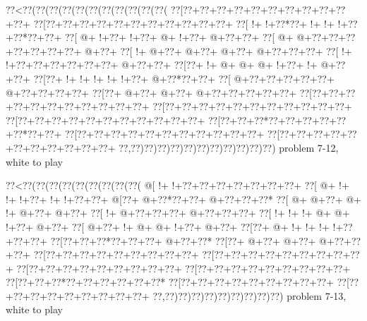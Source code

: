 \vbox{\vbox{\goo
\0??<\0??(\0??(\0??(\0??(\0??(\0??(\0??(\0??(\0??(\0??(\0??(
\0??[\0??+\0??+\0??+\0??+\0??+\0??+\0??+\0??+\0??+\0??+\0??+
\0??[\0??+\0??+\0??+\0??+\0??+\0??+\0??+\0??+\0??+\0??+\0??+
\0??[\- !+\- !+\0??*\0??+\- !+\- !+\- !+\0??+\0??*\0??+\0??+
\0??[\- @+\- !+\0??+\- !+\0??+\- @+\- !+\0??+\- @+\0??+\0??+
\0??[\- @+\- @+\0??+\0??+\0??+\0??+\0??+\0??+\0??+\- @+\0??+
\0??[\- !+\- @+\0??+\- @+\0??+\- @+\0??+\- @+\0??+\0??+\0??+
\0??[\- !+\- !+\0??+\0??+\0??+\0??+\0??+\0??+\- @+\0??+\0??+
\0??[\0??+\- !+\- @+\- @+\- @+\- !+\0??+\- !+\- @+\0??+\0??+
\0??[\0??+\- !+\- !+\- !+\- !+\- !+\0??+\- @+\0??*\0??+\0??+
\0??[\- @+\0??+\0??+\0??+\0??+\0??+\- @+\0??+\0??+\0??+\0??+
\0??[\0??+\- @+\0??+\- @+\0??+\- @+\0??+\0??+\0??+\0??+\0??+
\0??[\0??+\0??+\0??+\0??+\0??+\0??+\0??+\0??+\0??+\0??+\0??+
\0??[\0??+\0??+\0??+\0??+\0??+\0??+\0??+\0??+\0??+\0??+\0??+
\0??[\0??+\0??+\0??+\0??+\0??+\0??+\0??+\0??+\0??+\0??+\0??+
\0??[\0??+\0??+\0??*\0??+\0??+\0??+\0??+\0??+\0??*\0??+\0??+
\0??[\0??+\0??+\0??+\0??+\0??+\0??+\0??+\0??+\0??+\0??+\0??+
\0??[\0??+\0??+\0??+\0??+\0??+\0??+\0??+\0??+\0??+\0??+\0??+
\0??,\0??)\0??)\0??)\0??)\0??)\0??)\0??)\0??)\0??)\0??)\0??)
}
\hfil problem 7-12, white to play\hfil\break
}

\vbox{\vbox{\goo
\0??<\0??(\0??(\0??(\0??(\0??(\0??(\0??(\0??(\0??(
\- @[\- !+\- !+\0??+\0??+\0??+\0??+\0??+\0??+\0??+
\0??[\- @+\- !+\- !+\- !+\0??+\- !+\- !+\0??+\0??+
\- @[\0??+\- @+\0??*\0??+\0??+\- @+\0??+\0??+\0??*
\0??[\- @+\- @+\0??+\- @+\- !+\- @+\0??+\- @+\0??+
\0??[\- !+\- @+\0??+\0??+\0??+\- @+\0??+\0??+\0??+
\0??[\- !+\- !+\- !+\- @+\- @+\- !+\0??+\- @+\0??+
\0??[\- @+\0??+\- !+\- @+\- @+\- !+\0??+\- @+\0??+
\0??[\0??+\- @+\- !+\- !+\- !+\- !+\0??+\0??+\0??+
\0??[\0??+\0??+\0??*\0??+\0??+\0??+\- @+\0??+\0??*
\0??[\0??+\- @+\0??+\- @+\0??+\- @+\0??+\0??+\0??+
\0??[\0??+\0??+\0??+\0??+\0??+\0??+\0??+\0??+\0??+
\0??[\0??+\0??+\0??+\0??+\0??+\0??+\0??+\0??+\0??+
\0??[\0??+\0??+\0??+\0??+\0??+\0??+\0??+\0??+\0??+
\0??[\0??+\0??+\0??+\0??+\0??+\0??+\0??+\0??+\0??+
\0??[\0??+\0??+\0??*\0??+\0??+\0??+\0??+\0??+\0??*
\0??[\0??+\0??+\0??+\0??+\0??+\0??+\0??+\0??+\0??+
\0??[\0??+\0??+\0??+\0??+\0??+\0??+\0??+\0??+\0??+
\0??,\0??)\0??)\0??)\0??)\0??)\0??)\0??)\0??)\0??)
}
\hfil problem 7-13, white to play\hfil\break
}

